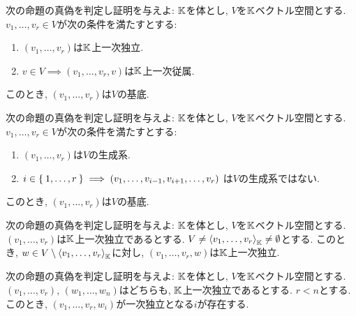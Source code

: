 \begin{quiz}
  次の命題の真偽を判定し証明を与えよ:
  $\mathbb{K}$を体とし,
  $V$を$\mathbb{K}$ベクトル空間とする.
  $v_1,\ldots, v_r\in V$が次の条件を満たすとする:
  \begin{enumerate}
  \item $(v_1,\ldots, v_r)$は$\mathbb{K}$上一次独立.
  \item $v\in V\implies (v_1,\ldots, v_r,v)$は$\mathbb{K}$上一次従属.
  \end{enumerate}
  このとき,
  $(v_1,\ldots, v_r)$は$V$の基底.
\end{quiz}


\begin{quiz}
  次の命題の真偽を判定し証明を与えよ:
  $\mathbb{K}$を体とし,
  $V$を$\mathbb{K}$ベクトル空間とする.
  $v_1,\ldots, v_r\in V$が次の条件を満たすとする:
  \begin{enumerate}
  \item $(v_1,\ldots, v_r)$は$V$の生成系.
  \item
    $i\in \Set{1,\ldots,r}\implies (v_1,\ldots, v_{i-1},v_{i+1},\ldots,v_r)$
    は$V$の生成系ではない.
  \end{enumerate}
  このとき,
  $(v_1,\ldots, v_r)$は$V$の基底.
\end{quiz}

\begin{quiz}
  次の命題の真偽を判定し証明を与えよ:
$\mathbb{K}$を体とし,
  $V$を$\mathbb{K}$ベクトル空間とする.
  $(v_1,\ldots, v_r)$は$\mathbb{K}$上一次独立であるとする.
  $V\neq\Braket{v_1,\ldots, v_r}_{\mathbb{K}}\neq \emptyset$とする.
  このとき, $w\in V\setminus\Braket{v_1,\ldots, v_r}_{\mathbb{K}}$に対し,
  $(v_1,\ldots,v_{r},w)$は$\mathbb{K}$上一次独立.
\end{quiz}

\begin{quiz}
  次の命題の真偽を判定し証明を与えよ:
$\mathbb{K}$を体とし,
  $V$を$\mathbb{K}$ベクトル空間とする.
  $(v_1,\ldots, v_r)$,
  $(w_1,\ldots, w_n)$はどちらも,
  $\mathbb{K}$上一次独立であるとする.
$r<n$とする.
  このとき,
$(v_1,\ldots,v_{r},w_{i})$が一次独立となる$i$が存在する.
\end{quiz}

